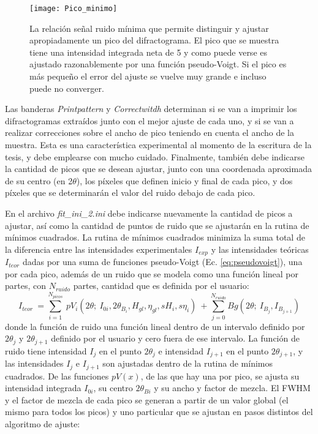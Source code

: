 \begin{figure}[!htb]
  \centering
  \texttt{[image: Pico\_minimo]}
  \caption{La relación señal ruido mínima que permite distinguir y ajustar apropiadamente un pico del difractograma. El pico que se muestra tiene una intensidad integrada neta de 5 y como puede verse es ajustado razonablemente por una función pseudo-Voigt. Si el pico es más pequeño el error del ajuste se vuelve muy grande e incluso puede no converger.}
  \label{fig:MinIntensity}
\end{figure}

Las banderas \textit{Printpattern} y \textit{Correctwitdh} determinan si se van a imprimir los difractogramas extraídos junto con el mejor ajuste de cada uno, y si se van a realizar correcciones sobre el ancho de pico teniendo en cuenta el ancho de la muestra.
Esta es una característica experimental al momento de la escritura de la tesis, y debe emplearse con mucho cuidado.
Finalmente, también debe indicarse la cantidad de picos que se desean ajustar, junto con una coordenada aproximada de su centro (en 2$\theta$), los píxeles que definen inicio y final de cada pico, y dos píxeles que se determinarán el valor del ruido debajo de cada pico.

En el archivo \hypertarget{fitini}{\textit{fit\_ini\_2.ini}} debe indicarse nuevamente la cantidad de picos a ajustar, así como la cantidad de puntos de ruido que se ajustarán en la rutina de mínimos cuadrados.
La rutina de mínimos cuadrados minimiza la suma total de la diferencia entre las intensidades experimentales $I_{exp}$ y las intensidades teóricas $I_{teor}$ dadas por una suma de funciones pseudo-Voigt (Ec. \ref{eq:pseudovoigt}), una por cada pico, además de un ruido que se modela como una función lineal por partes, con $N_{ruido}$ partes, cantidad que es definida por el usuario:
\begin{equation}
  I_{teor} \ = \sum_{i=1}^{N_{picos}} \ pV_i (2\theta; \ I_{0i}, 2\theta_{B_i}, H_{gl}, \eta_{gl}, sH_i, s\eta_i) \ + \sum_{j=0}^{N_{ruido}} Bg(2\theta; \ I_{B_j}, I_{B_{j+1}})
  \label{eq:Iteor}
\end{equation}
\noindent
donde la función de ruido una función lineal dentro de un intervalo definido por $2\theta_j$ y $2\theta_{j+1}$ definido por el usuario y cero fuera de ese intervalo.
La función de ruido tiene intensidad $I_j$ en el punto $2\theta_j$ e intensidad $I_{j+1}$ en el punto $2\theta_{j+1}$, y las intensidades $I_j$ e $I_{j+1}$ son ajustadas dentro de la rutina de mínimos cuadrados.
De las funciones $pV(x)$, de las que hay una por pico, se ajusta su intensidad integrada $I_{0i}$, su centro $2\theta_{Bi}$ y su ancho y factor de mezcla.
El FWHM y el factor de mezcla de cada pico se generan a partir de un valor global (el mismo para todos los picos) y uno particular que se ajustan en pasos distintos del algoritmo de ajuste:

